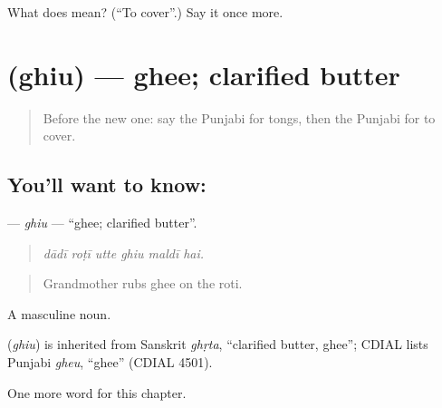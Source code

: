 \begin{tcolorbox}[breakable,colback=teal!4,colframe=teal!35!black,title={Before you move on}]
What does  mean? (\textquotedblleft{}To cover\textquotedblright{}.) Say it once more.
\end{tcolorbox}
\section[\texorpdfstring{\pa{ਘਿਉ} (ghiu)}{ਘਿਉ (ghiu)}]{ (ghiu) — ghee; clarified butter}

\label{lesson:PA-C239-ghiu}



\begin{quote}
Before the new one: say the Punjabi for tongs, then the Punjabi for to cover.
\end{quote}

\subsection*{You'll want to know: }
\textbf{} — \emph{ghiu} — \textquotedblleft{}ghee; clarified butter\textquotedblright{}.

\begin{quote}
     
\end{quote}

\begin{quote}
\emph{dādī roṭī utte ghiu maldī hai.}
\end{quote}

\begin{quote}
Grandmother rubs ghee on the roti.
\end{quote}

A masculine noun.

\begin{cousinweb}
\textbf{} (\emph{ghiu}) is inherited from Sanskrit \emph{ghṛta}, \textquotedblleft{}clarified butter, ghee\textquotedblright{}; CDIAL lists Punjabi \emph{gheu}, \textquotedblleft{}ghee\textquotedblright{} (CDIAL 4501).
\end{cousinweb}

\begin{grammarlens}[title={What you've built}]
One more word for this chapter.
\end{grammarlens}


